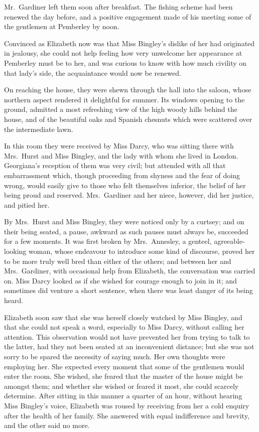 Mr.\ Gardiner left them soon after breakfast. The fishing
scheme had been renewed the day before, and a positive
engagement made of his meeting some of the gentlemen at
Pemberley by noon.


Convinced as Elizabeth now was that Miss Bingley’s
dislike of her had originated in jealousy, she could not
help feeling how very unwelcome her appearance at
Pemberley must be to her, and was curious to know with
how much civility on that lady’s side, the acquaintance
would now be renewed.

On reaching the house, they were shewn through the
hall into the saloon, whose northern aspect rendered it
delightful for summer. Its windows opening to the ground,
admitted a most refreshing view of the high woody hills
behind the house, and of the beautiful oaks and Spanish
chesnuts which were scattered over the intermediate lawn.

In this room they were received by Miss Darcy, who
was sitting there with Mrs.\ Hurst and Miss Bingley, and
the lady with whom she lived in London. Georgiana’s
reception of them was very civil; but attended with all
that embarrassment which, though proceeding from shyness
and the fear of doing wrong, would easily give to
those who felt themselves inferior, the belief of her being
proud and reserved. Mrs.\ Gardiner and her niece, however,
did her justice, and pitied her.

By Mrs.\ Hurst and Miss Bingley, they were noticed only
by a curtsey; and on their being seated, a pause, awkward
as such pauses must always be, succeeded for a few
moments. It was first broken by Mrs.\ Annesley, a genteel,
agreeable-looking woman, whose endeavour to introduce
some kind of discourse, proved her to be more truly well
bred than either of the others; and between her and
Mrs.\ Gardiner, with occasional help from Elizabeth, the
conversation was carried on. Miss Darcy looked as if she
wished for courage enough to join in it; and sometimes
did venture a short sentence, when there was least danger
of its being heard.

Elizabeth soon saw that she was herself closely watched
by Miss Bingley, and that she could not speak a word,
especially to Miss Darcy, without calling her attention.
This observation would not have prevented her from
trying to talk to the latter, had they not been seated at
an inconvenient distance; but she was not sorry to be
spared the necessity of saying much. Her own thoughts
were employing her. She expected every moment that
some of the gentlemen would enter the room. She wished,
she feared that the master of the house might be amongst
them; and whether she wished or feared it most, she could
scarcely determine. After sitting in this manner a quarter
of an hour, without hearing Miss Bingley’s voice, Elizabeth
was roused by receiving from her a cold enquiry after the
health of her family. She answered with equal indifference
and brevity, and the other said no more.

